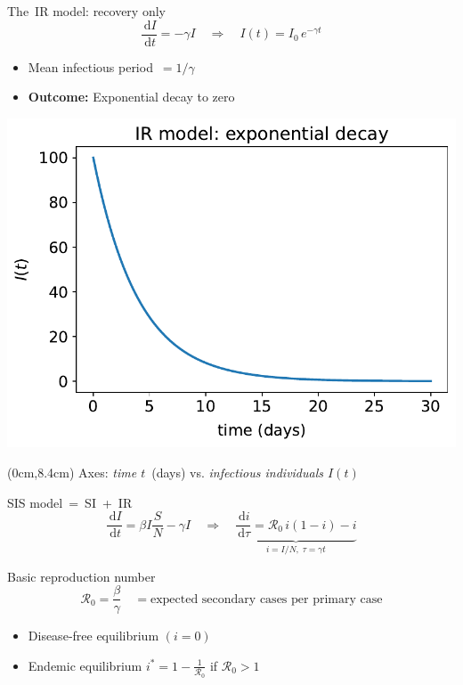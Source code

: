 \documentclass[14pt,aspectratio=169]{beamer}
\newcommand{\dd}{\,\mathrm{d}}
\newcommand{\RR}{\mathcal{R}_0}
\begin{document}
\begin{frame}{The IR model: recovery only}
  \[
    \frac{\dd I}{\dd t}=-\gamma I
    \quad\Longrightarrow\quad
    I(t)=I_0\,e^{-\gamma t}
  \]
  \begin{itemize}
    \item Mean infectious period $=1/\gamma$
    \item \textbf{Outcome:} Exponential decay to zero
  \end{itemize}
  \centering
  \includegraphics{DecayIllustration.pdf}
  \begin{textblock*}{\textwidth}(0cm,8.4cm)
    {\scriptsize Axes: \emph{time $t$} (days) vs. \emph{infectious individuals $I(t)$}}
  \end{textblock*}
\end{frame}

\begin{frame}{SIS model = SI + IR}
  \[
    \frac{\dd I}{\dd t}=\beta I\frac{S}{N}-\gamma I
    \quad\Longrightarrow\quad
    \underbrace{\frac{\dd i}{\dd \tau}=\RR\,i(1-i)-i}_{\textstyle i=I/N,\;\tau=\gamma t}
  \]
  \begin{block}{Basic reproduction number}
    \[
      \RR = \frac{\beta}{\gamma}\quad=\text{expected secondary cases per primary case}
    \]
  \end{block}
  \begin{itemize}
    \item Disease‑free equilibrium $(i=0)$
    \item Endemic equilibrium $i^*=1-\tfrac1{\RR}$ if $\RR>1$
  \end{itemize}
\end{frame}
\end{document}
